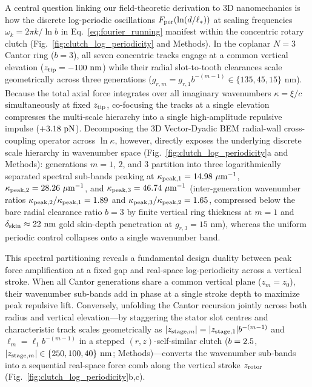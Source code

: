\documentclass[pdflatex,sn-nature]{sn-jnl}
\DeclareRobustCommand{\roundtwo}[1]{\fpeval{round(#1,2)}}
\begin{document}
A central question linking our field-theoretic derivation to 3D nanomechanics is how the discrete log-periodic oscillations $F_{\rm per}(\ln(d/\ell_*))$ at scaling frequencies $\omega_k = 2\pi k / \ln b$ in Eq.~\eqref{eq:fourier_running} manifest within the concentric rotary clutch (Fig.~\ref{fig:clutch_log_periodicity} and Methods). In the coplanar $N=3$ Cantor ring ($b=3$), all seven concentric tracks engage at a common vertical elevation ($z_{\rm tip} = -100\text{ nm}$) while their radial slot-to-tooth clearances scale geometrically across three generations ($g_{r,m} = g_{r,1} b^{-(m-1)} \in \{135, 45, 15\}\text{ nm}$). Because the total axial force integrates over all imaginary wavenumbers $\kappa = \xi/c$ simultaneously at fixed $z_{\rm tip}$, co-focusing the tracks at a single elevation compresses the multi-scale hierarchy into a single high-amplitude repulsive impulse ($+\roundtwo{\FractalNthreeCantorseventrackBemThetathreeFZPn}\text{ pN}$). Decomposing the 3D Vector-Dyadic BEM radial-wall cross-coupling operator across $\ln\kappa$, however, directly exposes the underlying discrete scale hierarchy in wavenumber space (Fig.~\ref{fig:clutch_log_periodicity}a and Methods): generations $m=1$, $2$, and $3$ partition into three logarithmically separated spectral sub-bands peaking at $\kappa_{{\rm peak},1} = \roundtwo{\LogperKPeakLoneUmInv}\ \mu\text{m}^{-1}$, $\kappa_{{\rm peak},2} = \roundtwo{\LogperKPeakLtwoUmInv}\ \mu\text{m}^{-1}$, and $\kappa_{{\rm peak},3} = \roundtwo{\LogperKPeakLthreeUmInv}\ \mu\text{m}^{-1}$ (inter-generation wavenumber ratios $\kappa_{{\rm peak},2}/\kappa_{{\rm peak},1} = \roundtwo{\LogperKPeakRatioTwoone}$ and $\kappa_{{\rm peak},3}/\kappa_{{\rm peak},2} = \roundtwo{\LogperKPeakRatioThreetwo}$, compressed below the bare radial clearance ratio $b=3$ by finite vertical ring thickness at $m=1$ and $\delta_{\rm skin} \approx 22\text{ nm}$ gold skin-depth penetration at $g_{r,3} = 15\text{ nm}$), whereas the uniform periodic control collapses onto a single wavenumber band.

This spectral partitioning reveals a fundamental design duality between peak force amplification at a fixed gap and real-space log-periodicity across a vertical stroke. When all Cantor generations share a common vertical plane ($z_m = z_0$), their wavenumber sub-bands add in phase at a single stroke depth to maximize peak repulsive lift. Conversely, unfolding the Cantor recursion jointly across both radius and vertical elevation---by staggering the stator slot centres and characteristic track scales geometrically as $|z_{{\rm stage},m}| = |z_{{\rm stage},1}| b^{-(m-1)}$ and $\ell_m = \ell_1 b^{-(m-1)}$ in a stepped $(r,z)$-self-similar clutch ($b=2.5{}$, $|z_{{\rm stage},m}| \in \{250, 100, 40\}\text{ nm}$; Methods)---converts the wavenumber sub-bands into a sequential real-space force comb along the vertical stroke $z_{\rm rotor}$ (Fig.~\ref{fig:clutch_log_periodicity}b,c).
\end{document}
